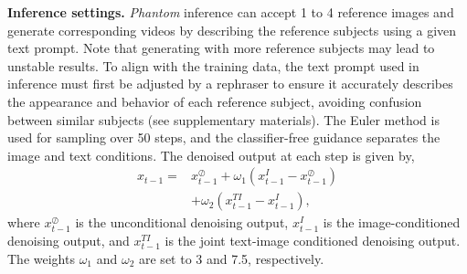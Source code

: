 \noindent \textbf{Inference settings.}
\textit{Phantom} inference can accept 1 to 4 reference images and generate corresponding videos by describing the reference subjects using a given text prompt. Note that generating with more reference subjects may lead to unstable results. 
To align with the training data, the text prompt used in inference must first be adjusted by a rephraser to ensure it accurately describes the appearance and behavior of each reference subject, avoiding confusion between similar subjects (see supplementary materials). 
The Euler method is used for sampling over 50 steps, and the classifier-free guidance \cite{ho2022classifier} separates the image and text conditions. The denoised output at each step is given by,
\begin{equation}
	\begin{split}
		x_{t-1} = & x_{t-1}^{\oslash} + \omega_1 ( x_{t-1}^I - x_{t-1}^{\oslash} ) \\
		& + \omega_2 ( x_{t-1}^{TI} - x_{t-1}^{I} ),
	\end{split}
	\label{eq:inference}
\end{equation}
where $x_{t-1}^{\oslash}$ is the unconditional denoising output, $x_{t-1}^I$ is the image-conditioned denoising output, and $x_{t-1}^{TI}$ is the joint text-image conditioned denoising output. The weights $\omega _1$ and $\omega _2$ are set to 3 and 7.5, respectively.

